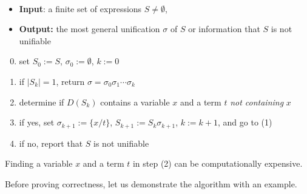 \begin{algorithm}{\,}
\begin{itemize}
    \item \textbf{Input}: a finite set of expressions $S\neq\emptyset$,
    \item \textbf{Output:} the most general unification $\sigma$ of $S$ or information that $S$ is not unifiable
\end{itemize}
\begin{enumerate}[(1)]\setcounter{enumi}{-1}
    \item set $S_0:=S$, $\sigma_0:=\emptyset$, $k:=0$
    \item if $|S_k|=1$, return $\sigma=\sigma_0\sigma_1\cdots \sigma_k$
    \item determine if $D(S_k)$ contains a variable $x$ and a term $t$ \emph{not containing} $x$ 
    \item if yes, set $\sigma_{k+1}:=\{x/t\}$, $S_{k+1}:=S_k\sigma_{k+1}$, $k:=k+1$, and go to (1)
    \item if no, report that $S$ is not unifiable
\end{enumerate}
\end{algorithm}

\begin{remark}
    Finding a variable $x$ and a term $t$ in step (2) can be computationally expensive.
\end{remark}

Before proving correctness, let us demonstrate the algorithm with an example.

